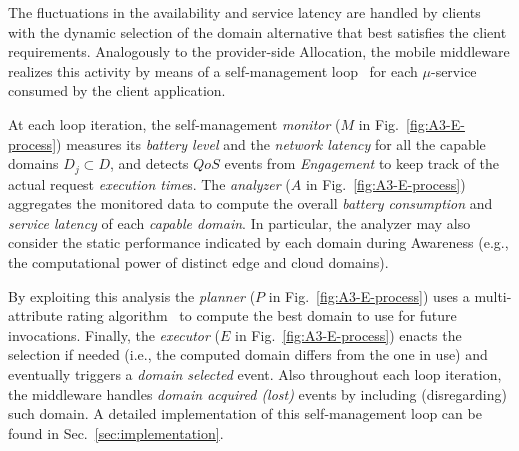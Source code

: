 








The fluctuations in the availability and service latency are handled by clients with the dynamic selection of the domain alternative that best satisfies the client requirements. Analogously to the provider-side Allocation, the mobile middleware realizes this activity by means of a self-management loop~\cite{kephart2003vision} for each $\mu$-service consumed by the client application.

At each loop iteration, the self-management \textit{monitor} ($M$ in Fig.~\ref{fig:A3-E-process}) measures its \textit{battery level} and the \textit{network latency} for all the capable domains $D_{j} \subset D$, and detects $QoS$ events from \textit{Engagement} to keep track of the actual request \textit{execution time}s. The \textit{analyzer} ($A$ in Fig.~\ref{fig:A3-E-process}) aggregates the monitored data to compute the overall \textit{battery consumption} and \textit{service latency} of each \textit{capable domain}. In particular, the analyzer may also consider the static performance indicated by each domain during Awareness (e.g., the computational power of distinct edge and cloud domains).

By exploiting this analysis the \textit{planner}  ($P$ in Fig.~\ref{fig:A3-E-process}) uses a multi-attribute rating algorithm~\cite{Olson1996} to compute the best domain to use for future invocations. Finally, the \textit{executor} ($E$ in Fig.~\ref{fig:A3-E-process}) enacts the selection if needed (i.e., the computed domain differs from the one in use) and eventually  triggers a \textit{domain selected} event. Also throughout each loop iteration, the middleware handles \textit{domain acquired (lost)} events 
by including (disregarding) such domain. A detailed implementation of this self-management loop can be found in Sec.~\ref{sec:implementation}.

